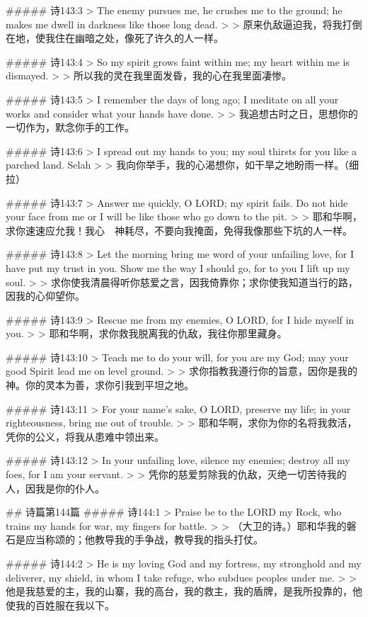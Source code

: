##### 诗143:3
> The enemy pursues me, he crushes me to the ground; he makes me dwell in darkness like those long dead.
>
> 原来仇敌逼迫我，将我打倒在地，使我住在幽暗之处，像死了许久的人一样。


##### 诗143:4
> So my spirit grows faint within me; my heart within me is dismayed.
>
> 所以我的灵在我里面发昏，我的心在我里面凄惨。


##### 诗143:5
> I remember the days of long ago; I meditate on all your works and consider what your hands have done.
>
> 我追想古时之日，思想你的一切作为，默念你手的工作。


##### 诗143:6
> I spread out my hands to you; my soul thirsts for you like a parched land. Selah
>
> 我向你举手，我的心渴想你，如干旱之地盼雨一样。（细拉）


##### 诗143:7
> Answer me quickly, O LORD; my spirit fails. Do not hide your face from me or I will be like those who go down to the pit.
>
> 耶和华啊，求你速速应允我！我心　神耗尽，不要向我掩面，免得我像那些下坑的人一样。


##### 诗143:8
> Let the morning bring me word of your unfailing love, for I have put my trust in you. Show me the way I should go, for to you I lift up my soul.
>
> 求你使我清晨得听你慈爱之言，因我倚靠你；求你使我知道当行的路，因我的心仰望你。


##### 诗143:9
> Rescue me from my enemies, O LORD, for I hide myself in you.
>
> 耶和华啊，求你救我脱离我的仇敌，我往你那里藏身。


##### 诗143:10
> Teach me to do your will, for you are my God; may your good Spirit lead me on level ground.
>
> 求你指教我遵行你的旨意，因你是我的　神。你的灵本为善，求你引我到平坦之地。


##### 诗143:11
> For your name's sake, O LORD, preserve my life; in your righteousness, bring me out of trouble.
>
> 耶和华啊，求你为你的名将我救活，凭你的公义，将我从患难中领出来。


##### 诗143:12
> In your unfailing love, silence my enemies; destroy all my foes, for I am your servant.
>
> 凭你的慈爱剪除我的仇敌，灭绝一切苦待我的人，因我是你的仆人。


## 诗篇第144篇
##### 诗144:1
> Praise be to the LORD my Rock, who trains my hands for war, my fingers for battle.
>
> （大卫的诗。）耶和华我的磐石是应当称颂的；他教导我的手争战，教导我的指头打仗。


##### 诗144:2
> He is my loving God and my fortress, my stronghold and my deliverer, my shield, in whom I take refuge, who subdues peoples under me.
>
> 他是我慈爱的主，我的山寨，我的高台，我的救主，我的盾牌，是我所投靠的，他使我的百姓服在我以下。


